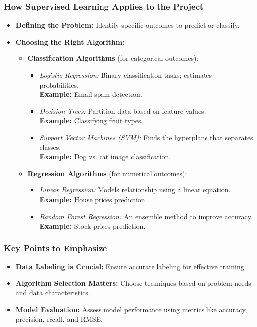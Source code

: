 \documentclass[aspectratio=169]{beamer}
\begin{document}
\begin{frame}[fragile]
  \frametitle{How Supervised Learning Applies to the Project}
  \begin{itemize}
    \item \textbf{Defining the Problem:} Identify specific outcomes to predict or classify. 
    \item \textbf{Choosing the Right Algorithm:}
      \begin{itemize}
        \item \textbf{Classification Algorithms} (for categorical outcomes):
          \begin{itemize}
            \item \textit{Logistic Regression:} Binary classification tasks; estimates probabilities. \\ \textbf{Example:} Email spam detection.
            \item \textit{Decision Trees:} Partition data based on feature values. \\ \textbf{Example:} Classifying fruit types.
            \item \textit{Support Vector Machines (SVM):} Finds the hyperplane that separates classes. \\ \textbf{Example:} Dog vs. cat image classification.
          \end{itemize}
        \item \textbf{Regression Algorithms} (for numerical outcomes):
          \begin{itemize}
            \item \textit{Linear Regression:} Models relationship using a linear equation. \\ \textbf{Example:} House prices prediction.
            \item \textit{Random Forest Regression:} An ensemble method to improve accuracy. \\ \textbf{Example:} Stock prices prediction.
          \end{itemize}
      \end{itemize}
  \end{itemize}
\end{frame}

\begin{frame}[fragile]
  \frametitle{Key Points to Emphasize}
  \begin{itemize}
    \item \textbf{Data Labeling is Crucial:} Ensure accurate labeling for effective training.
    \item \textbf{Algorithm Selection Matters:} Choose techniques based on problem needs and data characteristics.
    \item \textbf{Model Evaluation:} Assess model performance using metrics like accuracy, precision, recall, and RMSE.
  \end{itemize}
\end{frame}
\end{document}
